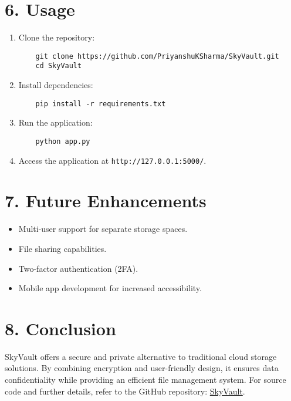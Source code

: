 \documentclass[12pt,a4paper]{article}
\begin{document}
\section*{6. Usage}
\begin{tcolorbox}[colback=gray!5!white, colframe=gray!75!black, sharp corners, boxrule=0.5mm]
\begin{enumerate}
    \item Clone the repository:
    \begin{Verbatim}
    git clone https://github.com/PriyanshuKSharma/SkyVault.git
    cd SkyVault
    \end{Verbatim}
    \item Install dependencies:
    \begin{Verbatim}
    pip install -r requirements.txt
    \end{Verbatim}
    \item Run the application:
    \begin{Verbatim}
    python app.py
    \end{Verbatim}
    \item Access the application at \texttt{http://127.0.0.1:5000/}.
\end{enumerate}
\end{tcolorbox}

\section*{7. Future Enhancements}
\begin{itemize}
    \item Multi-user support for separate storage spaces.
    \item File sharing capabilities.
    \item Two-factor authentication (2FA).
    \item Mobile app development for increased accessibility.
\end{itemize}

\section*{8. Conclusion}
SkyVault offers a secure and private alternative to traditional cloud storage solutions. By combining encryption and user-friendly design, it ensures data confidentiality while providing an efficient file management system. For source code and further details, refer to the GitHub repository: \href{https://github.com/PriyanshuKSharma/SkyVault.git}{SkyVault}.
\end{document}
